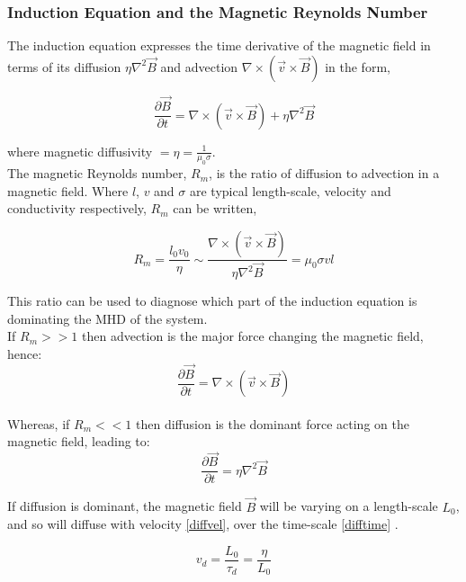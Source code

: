 
\subsubsection{Induction Equation and the Magnetic Reynolds Number}
The induction equation expresses the time derivative of the magnetic field in terms of its diffusion $\eta\nabla^{2}\vec{B}$ and advection $\nabla\times(\vec{v}\times\vec{B})$ in the form, 


\begin{equation}\label{induction}
\frac{\partial \vec{B}}{\partial t}=\nabla\times(\vec{v}\times\vec{B})+\eta\nabla^{2}\vec{B}  
\end{equation}

where magnetic diffusivity $=\eta =\frac{1}{\mu_{0}\sigma}$. \\

The magnetic Reynolds number, $R_m$, is the ratio of diffusion to advection in a magnetic field. Where $l$, $v$ and $\sigma$ are typical length-scale, velocity and conductivity respectively, $R_m$ can be written,  

\begin{equation}\label{reynolds}
R_{m} = \frac{l_{0}v_{0}}{\eta} \sim \frac{\nabla\times(\vec{v}\times\vec{B})}{\eta\nabla^{2}\vec{B}}=\mu_{0}\sigma v l
\end{equation}

This ratio can be used to diagnose which part of the induction equation is dominating the MHD of the system. \\

If $R_m >> 1$ then advection is the major force changing the magnetic field, hence:
\begin{equation}\label{r>>1}
\frac{\partial \vec{B}}{\partial t}=\nabla\times(\vec{v}\times\vec{B})
\end{equation}
\\

Whereas, if $R_m << 1$ then diffusion is the dominant force acting on the magnetic field, leading to:
\begin{equation}\label{r<<1}
\frac{\partial \vec{B}}{\partial t}=\eta\nabla^{2}\vec{B}
\end{equation}

If diffusion is dominant, the magnetic field $\vec{B}$ will be varying on a length-scale $L_0$, and so will diffuse with velocity \ref{diffvel}, over the time-scale \ref{difftime} \citep{2003dysu.book.....D}.

\begin{equation}\label{diffvel}
v_d=\frac{L_0}{\tau_d} = \frac{\eta}{L_0}
\end{equation}


